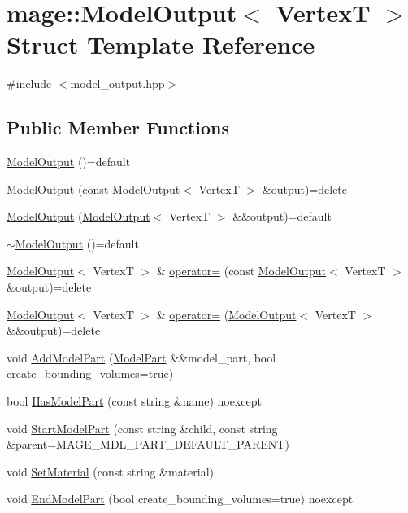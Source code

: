 \hypertarget{structmage_1_1_model_output}{}\section{mage\+:\+:Model\+Output$<$ VertexT $>$ Struct Template Reference}
\label{structmage_1_1_model_output}


{\ttfamily \#include $<$model\+\_\+output.\+hpp$>$}

\subsection*{Public Member Functions}
\begin{DoxyCompactItemize}
\item 
\hyperlink{structmage_1_1_model_output_a7d64b57d8207968541eb9c6da6ef0163}{Model\+Output} ()=default
\item 
\hyperlink{structmage_1_1_model_output_aac808e40a66f33da4ea28ebb7443623d}{Model\+Output} (const \hyperlink{structmage_1_1_model_output}{Model\+Output}$<$ VertexT $>$ \&output)=delete
\item 
\hyperlink{structmage_1_1_model_output_a20faa6e5b76ec7903a09e222e61e5353}{Model\+Output} (\hyperlink{structmage_1_1_model_output}{Model\+Output}$<$ VertexT $>$ \&\&output)=default
\item 
\hyperlink{structmage_1_1_model_output_a69a7f27486ad287943cbf973107ad8e1}{$\sim$\+Model\+Output} ()=default
\item 
\hyperlink{structmage_1_1_model_output}{Model\+Output}$<$ VertexT $>$ \& \hyperlink{structmage_1_1_model_output_ada52bf380c0259a0d7ef855457e5a9da}{operator=} (const \hyperlink{structmage_1_1_model_output}{Model\+Output}$<$ VertexT $>$ \&output)=delete
\item 
\hyperlink{structmage_1_1_model_output}{Model\+Output}$<$ VertexT $>$ \& \hyperlink{structmage_1_1_model_output_a5e368e3ae8a52d329f8d9b5f1c4b9d03}{operator=} (\hyperlink{structmage_1_1_model_output}{Model\+Output}$<$ VertexT $>$ \&\&output)=delete
\item 
void \hyperlink{structmage_1_1_model_output_ad62942de2a55fce53d31aeafa1d0795a}{Add\+Model\+Part} (\hyperlink{structmage_1_1_model_part}{Model\+Part} \&\&model\+\_\+part, bool create\+\_\+bounding\+\_\+volumes=true)
\item 
bool \hyperlink{structmage_1_1_model_output_a90c6d42d13813b9c340bd1a250276a8d}{Has\+Model\+Part} (const string \&name) noexcept
\item 
void \hyperlink{structmage_1_1_model_output_a9e4d94547fbc318961d8c695149cdf14}{Start\+Model\+Part} (const string \&child, const string \&parent=M\+A\+G\+E\+\_\+\+M\+D\+L\+\_\+\+P\+A\+R\+T\+\_\+\+D\+E\+F\+A\+U\+L\+T\+\_\+\+P\+A\+R\+E\+NT)
\item 
void \hyperlink{structmage_1_1_model_output_abd614f9f2e9f9dbc0b2c354ee37f2998}{Set\+Material} (const string \&material)
\item 
void \hyperlink{structmage_1_1_model_output_aca4628ef55d8ded956de4c06e1433f45}{End\+Model\+Part} (bool create\+\_\+bounding\+\_\+volumes=true) noexcept
\end{DoxyCompactItemize}
